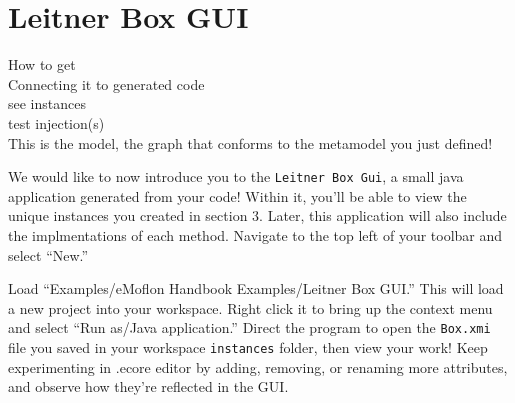 \newpage
\section{Leitner Box GUI}
\genHeader

How to get\\
Connecting it to generated code\\
	see instances\\
	test injection(s)\\
	
This is the model, the graph that conforms to the metamodel you just defined!

We would like to now introduce you to the \texttt{Leitner Box Gui}, a small java application generated from your code! Within it, you'll be able to view the
unique instances you created in section 3. Later, this application will also include the implmentations of each method. Navigate to the top left of your toolbar
and select ``New.''

Load ``Examples/eMoflon Handbook Examples/Leitner Box GUI.'' This will load a new project into your workspace. Right click it to bring up the context menu and
select ``Run as/Java application.'' Direct the program to open the \texttt{Box.xmi} file you saved in your workspace \texttt{instances} folder, then view your
work! Keep experimenting in .ecore editor by adding, removing, or renaming more attributes, and observe how they're reflected in the GUI.
